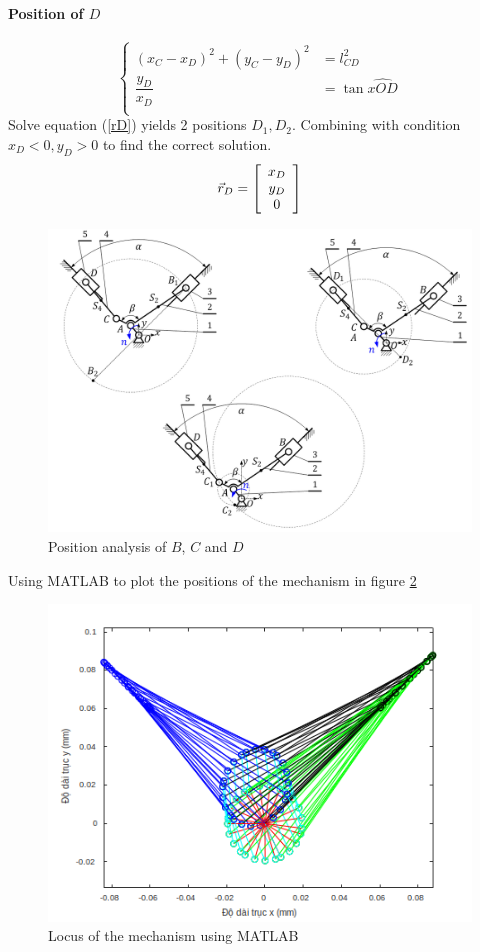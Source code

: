 \paragraph{Position of $ D $}
\begin{equation}\label{rD}
\left\{
\begin{array}{cl}
(x_C-x_D)^2+(y_C-y_D)^2&=l_{CD}^2\\
\dfrac{y_D}{x_D}&=\tan \widehat{xOD}\\
\end{array}
\right.
\end{equation}
Solve equation (\ref{rD}) yields 2 positions $ D_1, D_2 $. Combining with condition $ x_D<0,y_D>0 $ to find the correct solution.
\[\vec{r}_D=
\left[ \begin{array}{c} x_D\\ y_D\\ 0 \end{array} \right]\]
\begin{figure}[ht]
	\centering
	\includegraphics[width=0.8\linewidth]{04}
	\caption{Position analysis of $B$, $C$ and $D$}
	\label{fig:04}
\end{figure}
Using MATLAB\textup{\textregistered} to plot the positions of the mechanism in figure \ref{fig:05}
\begin{figure}[ht]
	\centering
	\includegraphics{05}
	\caption{Locus of the mechanism using MATLAB\textup{\textregistered}}
	\label{fig:05}
\end{figure}
